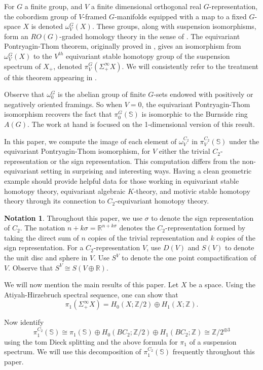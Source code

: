 \documentclass[11pt]{amsart}
\newcommand{\R}{\mathbb R}
\newcommand{\Z}{\mathbb{Z}}
\newcommand{\Sph}{\mathbb{S}}
\theoremstyle{plain}   %
\theoremstyle{definition}
\newtheorem{notn}[thm]{Notation}
\theoremstyle{remark}
\numberwithin{equation}{section}
\begin{document}
For $G$ a finite group, and $V$ a finite dimensional orthogonal real $G$-representation, the cobordism group of $V$-framed $G$-manifolds equipped with a map to a fixed $G$-space $X$ is denoted $\omega_V^G(X)$. These groups, along with suspension isomorphisms, form an $RO(G)$-graded homology theory in the sense of \cite{alaska}. The equivariant Pontryagin-Thom theorem, originally proved in \cite{Hausschild1974, kosniowski_bordism}, gives an isomorphism from $\omega_V^G(X)$ to the $V^{th}$ equivariant stable homotopy group of the suspension spectrum of $X_+$, denoted $\pi_V^G(\Sigma_+^\infty X)$. We will consistently refer to the treatment of this theorem appearing in \cite{williams_cobordism}. 

Observe that $\omega_0^G$ is the abelian group of finite $G$-sets endowed with positively or negatively oriented framings. So when $V=0$, the equivariant Pontryagin-Thom isomorphism recovers the fact that $\pi_0^G(\Sph)$ is isomorphic to the Burnside ring $A(G)$. The work at hand is focused on the 1-dimensional version of this result.

In this paper, we compute the image of each element of $\omega_V^{C_2}$ in $\pi_V^{C_2}(\Sph)$ under the equivariant Pontryagin-Thom isomorphism, for $V$ either the trivial $C_2$-representation or the sign representation. This computation differs from the non-equivariant setting in surprising and interesting ways. Having a clean geometric example should provide helpful data for those working in equivariant stable homotopy theory, equivariant algebraic $K$-theory, and motivic stable homotopy theory through its connection to $C_2$-equivariant homotopy theory.

\begin{notn}
Throughout this paper, we use $\sigma$ to denote the sign representation of $C_2$. The notation $n+k\sigma=\R^{n+k\sigma}$ denotes the $C_2$-representation formed by taking the direct sum of $n$ copies of the trivial representation and $k$ copies of the sign representation. For a $C_2$-representation $V$, use $D(V)$ and $S(V)$ to denote the unit disc and sphere in $V$. Use $S^V$ to denote the one point compactification of $V$. Observe that $S^V\cong S(V\oplus \R)$. 
\end{notn}

We will now mention the main results of this paper. Let $X$ be a space. Using the Atiyah-Hirzebruch spectral sequence, one can show that 
\[
\pi_1(\Sigma_+^\infty X) = H_0(X;\Z/2)\oplus H_1(X;\Z).
\]

Now identify 
\[
\pi_1^{C_2}(\Sph) \cong \pi_1(\Sph)\oplus H_0(BC_2;\Z/2)\oplus H_1(BC_2;\Z)\cong \Z/2^{\oplus 3}
\]
using the tom Dieck splitting and the above formula for $\pi_1$ of a suspension spectrum. We will use this decomposition of $\pi_1^{C_2}(\Sph)$ frequently throughout this paper. 
\end{document}
